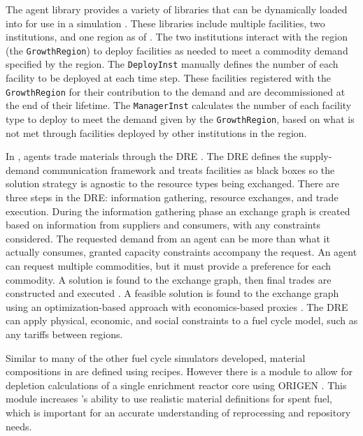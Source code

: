 The \Cycamore agent library provides a variety of libraries that can be 
dynamically loaded into \Cyclus for use in a simulation 
\cite{carlsen_cycamore_2014,huff_fundamental_2016}. These libraries 
include multiple facilities, two institutions, and one region as of 
 \cite{huff_fundamental_2016}. The two institutions interact 
with the region (the \Cycamore \texttt{GrowthRegion}) to deploy 
facilities as needed to meet a commodity demand specified by the region. 
The \Cycamore \texttt{DeployInst} manually defines the number of each 
facility to be deployed at each time step. These facilities 
registered with the \Cycamore \texttt{GrowthRegion} for their 
contribution to the demand and are decommissioned at the end of their 
lifetime. The 
\Cycamore \texttt{ManagerInst} calculates the number of each facility 
type to deploy to meet the demand given by the \texttt{GrowthRegion}, 
based on what is not met through facilities deployed by other institutions 
in the region.  

In \Cyclus, agents trade materials through the \gls{DRE} 
\cite{gidden_agent-based_2015,huff_fundamental_2016}. The \gls{DRE} defines the 
supply-demand communication framework and treats facilities as black boxes
so the solution strategy is agnostic to the resource types being exchanged. 
There are three steps in the \gls{DRE}: information gathering, resource 
exchanges, and trade execution. During the information gathering 
phase an exchange graph is created based on information from suppliers 
and consumers, with any constraints considered. The requested demand from 
an agent 
can be more than what it actually consumes, granted capacity constraints 
accompany the request. An agent can request multiple commodities, but 
it must provide a preference for each commodity. A solution is found to the 
exchange graph, then final trades are constructed and executed 
\cite{gidden_methodology_2016}. A feasible solution is found to the 
exchange graph using an optimization-based 
approach with economics-based proxies \cite{gidden_methodology_2016}. 
The \gls{DRE} can apply physical, economic, and social 
constraints to a fuel cycle model, such as any tariffs between regions. 

Similar to many of the other fuel cycle simulators developed, material 
compositions in \Cyclus are 
defined using recipes. However there is a module to allow for 
depletion calculations of a single enrichment reactor core using ORIGEN 
\cite{skutnik_cyborg:_2016}. This module increases \Cyclus's ability 
to use realistic material definitions for spent fuel, which is 
important for an accurate understanding of reprocessing and repository 
needs. 

